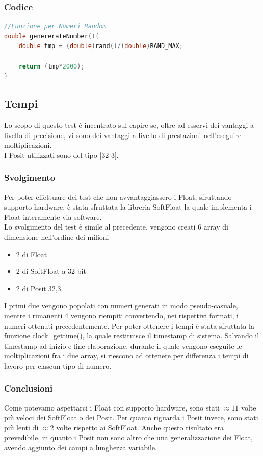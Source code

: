 \documentclass[a4paper,11pt]{article}
\begin{document}
\subsubsection{Codice}
\begin{lstlisting}[language=C++]
//Funzione per Numeri Random
double genererateNumber(){
	double tmp = (double)rand()/(double)RAND_MAX;
	
	return (tmp*2000);
}

\end{lstlisting}
\newpage
\subsection{Tempi}
Lo scopo di questo test è incentrato sul capire se, oltre ad esservi dei vantaggi a livello di precisione, vi sono dei vantaggi a livello di prestazioni nell'eseguire moltiplicazioni.\\
I Posit utilizzati sono del tipo [32-3]. 


\subsubsection{Svolgimento}
Per poter effettuare dei test che non avvantaggiassero i Float, sfruttando supporto hardware, è stata sfruttata la libreria SoftFloat\cite{softfloat} la quale implementa i Float interamente via software.\\
Lo svolgimento del test è simile al precedente, vengono creati 6 array di dimensione nell'ordine dei milioni \begin{itemize}
	\item 2 di Float
	\item 2 di SoftFloat a 32 bit
	\item 2 di Posit[32,3]
\end{itemize}
I primi due vengono popolati con numeri generati in modo pseudo-casuale, mentre i rimanenti 4 vengono riempiti convertendo, nei rispettivi formati, i numeri ottenuti precedentemente. Per poter ottenere i tempi è stata sfruttata la funzione clock\_gettime(), la quale restituisce il timestamp di sistema. Salvando il timestamp ad inizio e fine elaborazione, durante il quale vengono eseguite le moltiplicazioni fra i due array, si riescono ad ottenere per differenza i tempi di lavoro per ciascun tipo di numero.

\subsubsection{Conclusioni}
Come potevamo aspettarci i Float con supporto hardware, sono stati $\approx11$ volte più veloci dei SoftFloat o dei Posit. Per quanto riguarda i Posit invece, sono stati più lenti di $\approx2$ volte rispetto ai SoftFloat. Anche questo risultato era prevedibile, in quanto i Posit non sono altro che una generalizzazione dei Float, avendo aggiunto dei campi a lunghezza variabile. 
\newpage
\end{document}
